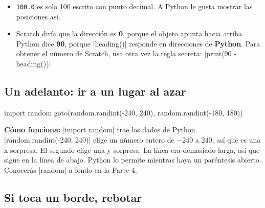 \begin{think}
\begin{itemize}
  \item \texttt{100.0} es solo 100 escrito con punto decimal. A Python le gusta mostrar las posiciones así.
  \item Scratch diría que la dirección es \textbf{0}, porque el objeto apunta hacia arriba. Python dice \textbf{90}, porque \py|heading()| responde en direcciones de \textbf{Python}. Para obtener el número de Scratch, usa otra vez la regla secreta: \py|print(90 - heading())|.
\end{itemize}
\end{think}

\subsection*{Un adelanto: ir a un lugar al azar}

\begin{tcbraster}[raster columns=5, raster equal height=rows, raster column skip=12pt, raster valign=center]
\begin{tcolorbox}[raster multicolumn=2, colback=white, colframe=white, boxrule=0pt, valign=center]
\begin{scratch}
\end{scratch}
\end{tcolorbox}
\begin{tcolorbox}[raster multicolumn=3, blank]
\begin{code}
import random
goto(random.randint(-240, 240),
     random.randint(-180, 180))
\end{code}
\end{tcolorbox}
\end{tcbraster}

\textbf{Cómo funciona:} \py|import random| trae los dados de Python. \py|random.randint(-240, 240)| elige un número entero de $-240$ a $240$, así que es una x sorpresa. El segundo elige una y sorpresa. La línea era demasiado larga, así que sigue en la línea de abajo. Python lo permite mientras haya un paréntesis abierto. Conocerás \py|random| a fondo en la Parte 4.

\subsection*{Si toca un borde, rebotar}

